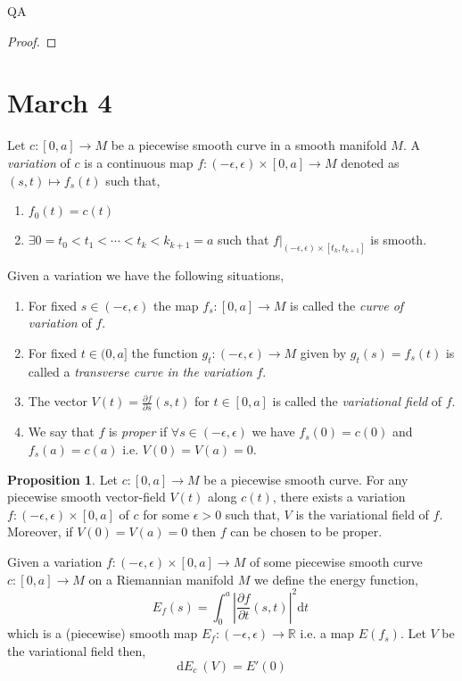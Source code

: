 QA	 \documentclass[12pt]{extarticle}
\newcommand{\R}{\mathbb{R}}
\renewcommand{\d}[1]{ \mathrm{d}#1 \:}
\newcommand{\pderiv}[2]{\frac{\partial{#1}}{\partial{#2}}}
\theoremstyle{definition}
\newtheorem{proposition}[theorem]{Proposition}
\newenvironment{definition}[1][Definition:]{\begin{trivlist}
\item[\hskip \labelsep {\bfseries #1}]}{\end{trivlist}}
\begin{document}
\begin{proof}

\end{proof}

\section{March 4}

\begin{definition}
Let $c : [0, a] \to M$ be a piecewise smooth curve in a smooth manifold $M$. A \textit{variation} of $c$ is a continuous map $f : (-\epsilon, \epsilon) \times [0, a] \to M$ denoted as $(s,t) \mapsto f_s(t)$ such that,
\begin{enumerate}
\item $f_0(t) = c(t)$
\item $\exists 0 = t_0 < t_1 < \cdots < t_k < k_{k+1} = a$ such that $f|_{(-\epsilon, \epsilon) \times [t_k, t_{k+1}]}$ is smooth.
\end{enumerate}
Given a variation we have the following situations,
\begin{enumerate}
\item For fixed $s \in (-\epsilon, \epsilon)$ the map $f_s : [0, a] \to M$ is called the \textit{curve of variation} of $f$. 
\item For fixed $t \in (0, a]$ the function $g_t : (-\epsilon, \epsilon) \to M$ given by $g_t(s) = f_s(t)$ is called a \textit{transverse curve in the variation} $f$.
\item The vector $V(t) = \pderiv{f}{s}(s,t)$ for $t \in [0, a]$ is called the \textit{variational field} of $f$. 
\item We say that $f$ is \textit{proper} if $\forall s \in (-\epsilon, \epsilon)$ we have $f_s(0) = c(0)$ and $f_s(a) = c(a)$ i.e. $V(0) = V(a) = 0$. 
\end{enumerate}
\end{definition}

\begin{proposition}
Let $c : [0, a] \to M$ be a piecewise smooth curve. For any piecewise smooth vector-field $V(t)$ along $c(t)$, there exists a variation $f : (-\epsilon, \epsilon) \times [0, a]$ of $c$ for some $\epsilon > 0$ such that, $V$ is the variational field of $f$. Moreover, if $V(0) = V(a) = 0$ then $f$ can be chosen to be proper. 
\end{proposition}

\begin{definition}[Energy Function]
Given a variation $f : (-\epsilon, \epsilon) \times [0, a] \to M$ of some piecewise smooth curve $c : [0, a] \to M$ on a Riemannian manifold $M$ we define the energy function,
\[ E_f(s) = \int_0^a \left| \pderiv{f}{t}(s,t) \right|^2 \d{t} \]
which is a (piecewise) smooth map $E_f : (-\epsilon, \epsilon) \to \R$ i.e. a map $E(f_s)$. Let $V$ be the variational field then,
\[ \d{E_c}(V) = E'(0) \]
\end{definition}
\end{document}
